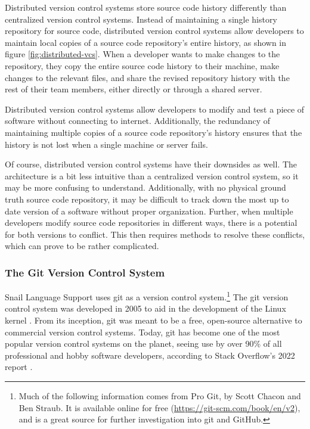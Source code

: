 \documentclass{article}
\begin{document}
Distributed version control systems store source code history differently than centralized version control systems. Instead of maintaining a single history repository for source code, distributed version control systems allow developers to maintain local copies of a source code repository's entire history, as shown in figure \ref{fig:distributed-vcs}. When a developer wants to make changes to the repository, they copy the entire source code history to their machine, make changes to the relevant files, and share the revised repository history with the rest of their team members, either directly or through a shared server.

Distributed version control systems allow developers to modify and test a piece of software without connecting to internet. Additionally, the redundancy of maintaining multiple copies of a source code repository's history ensures that the history is not lost when a single machine or server fails.

Of course, distributed version control systems have their downsides as well. The architecture is a bit less intuitive than a centralized version control system, so it may be more confusing to understand. Additionally, with no physical ground truth source code repository, it may be difficult to track down the most up to date version of a software without proper organization. Further, when multiple developers modify source code repositories in different ways, there is a potential for both versions to conflict. This then requires methods to resolve these conflicts, which can prove to be rather complicated.

\subsubsection{The Git Version Control System}

Snail Language Support uses git as a version control system.\footnote{Much of the following information comes from Pro Git, by Scott Chacon and Ben Straub. It is available online for free (\url{https://git-scm.com/book/en/v2}), and is a great source for further investigation into git and GitHub.} The git version control system was developed in 2005 to aid in the development of the Linux kernel \cite{ChaconStraub_2014}. From its inception, git was meant to be a free, open-source alternative to commercial version control systems. Today, git has become one of the most popular version control systems on the planet, seeing use by over 90\% of all professional and hobby software developers, according to Stack Overflow's 2022 report \cite{StackOverflow_2022}. 
\end{document}

